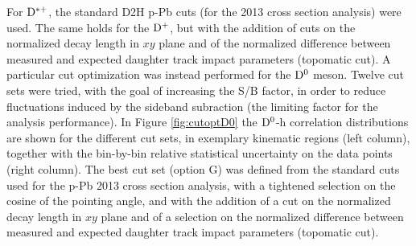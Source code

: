 For ${\rm D^{*+}}$, the standard D2H p-Pb cuts (for the 2013 cross section analysis) were used. The same holds for the ${\rm D^+}$, but with the addition of cuts on the normalized decay length in $xy$ plane and of the normalized difference between measured and expected daughter track impact parameters (topomatic cut).
A particular cut optimization was instead performed for the ${\rm D^0}$ meson. Twelve cut sets were tried, with the goal of increasing the S/B factor, in order to reduce fluctuations induced by the sideband subraction (the limiting factor for the analysis performance).
In Figure \ref{fig:cutoptD0} the ${\rm D^0}$-h correlation distributions are shown for the different cut sets, in exemplary kinematic regions (left column), together with the bin-by-bin relative statistical uncertainty on the data points (right column). The best cut set (option G) was defined from the standard cuts used for the p-Pb 2013 cross section analysis, with a tightened selection on the cosine of the pointing angle, and with the addition of a cut on the normalized decay length in $xy$ plane and of a selection on the normalized difference between measured and expected daughter track impact parameters (topomatic cut).

